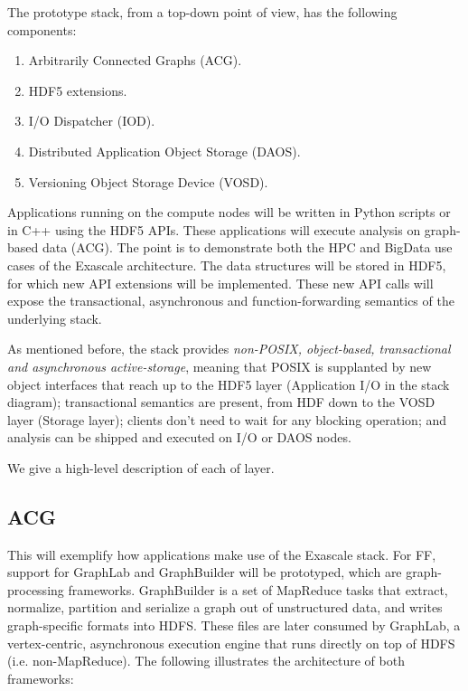 \documentclass[conference]{IEEEtran}
\begin{document}
The prototype stack, from a top-down point of view, has the following
components:

\begin{enumerate}
\def\labelenumi{\arabic{enumi}.}
\itemsep1pt\parskip0pt
\item
  Arbitrarily Connected Graphs (ACG).
\item
  HDF5 extensions.
\item
  I/O Dispatcher (IOD).
\item
  Distributed Application Object Storage (DAOS).
\item
  Versioning Object Storage Device (VOSD).
\end{enumerate}

Applications running on the compute nodes will be written in Python
scripts or in C++ using the HDF5 APIs. These applications will execute
analysis on graph-based data (ACG). The point is to demonstrate both the
HPC and BigData use cases of the Exascale architecture. The data
structures will be stored in HDF5, for which new API extensions will be
implemented. These new API calls will expose the transactional,
asynchronous and function-forwarding semantics of the underlying stack.

As mentioned before, the stack provides \emph{non-POSIX, object-based,
transactional and asynchronous active-storage}, meaning that POSIX is
supplanted by new object interfaces that reach up to the HDF5 layer
(Application I/O in the stack diagram); transactional semantics are
present, from HDF down to the VOSD layer (Storage layer); clients don't
need to wait for any blocking operation; and analysis can be shipped and
executed on I/O or DAOS nodes.

We give a high-level description of each of layer.

\subsection{ACG}\label{acg}

This will exemplify how applications make use of the Exascale stack. For
FF, support for
GraphLab 
and GraphBuilder will be prototyped, which are graph-processing
frameworks. GraphBuilder is a set of MapReduce tasks that extract,
normalize, partition and serialize a graph out of unstructured data, and
writes graph-specific formats into HDFS. These files are later consumed
by GraphLab, a vertex-centric, asynchronous execution engine that runs
directly on top of HDFS (i.e. non-MapReduce). The following illustrates
the architecture of both frameworks:
\end{document}
